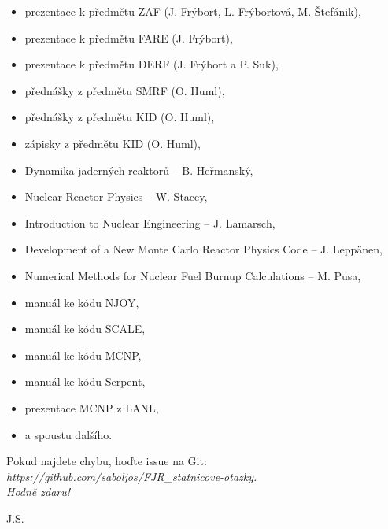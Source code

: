 \documentclass[a4paper, 11pt]{article}
\begin{document}
\begin{itemize}
    \item prezentace k předmětu ZAF (J. Frýbort, L. Frýbortová, M. Štefánik),
    \item prezentace k předmětu FARE (J. Frýbort),
    \item prezentace k předmětu DERF (J. Frýbort a P. Suk),
    \item přednášky z předmětu SMRF (O. Huml),
    \item přednášky z předmětu KID (O. Huml),
    \item zápisky z předmětu KID (O. Huml),
    \item Dynamika jaderných reaktorů -- B. Heřmanský,
    \item Nuclear Reactor Physics -- W. Stacey,
    \item Introduction to Nuclear Engineering -- J. Lamarsch,
    \item Development of a New Monte Carlo Reactor Physics Code -- J. Leppänen,
    \item Numerical Methods for Nuclear Fuel Burnup Calculations -- M. Pusa,
    \item manuál ke kódu NJOY,
    \item manuál ke kódu SCALE,
    \item manuál ke kódu MCNP,
    \item manuál ke kódu Serpent,
    \item prezentace MCNP z LANL,
    \item a spoustu dalšího.
\end{itemize}

Pokud najdete chybu, hoďte issue na Git: \it{https://github.com/saboljos/FJR\_statnicove-otazky}.\\

\rm Hodně zdaru!

\rm J.S.

\vspace{2em}

\clearpage{\pagestyle{empty}}



\newpage
\parskip=0pt
\begin{small}
\tableofcontents
\end{small}
\parskip=7pt
\newpage















\end{document}
